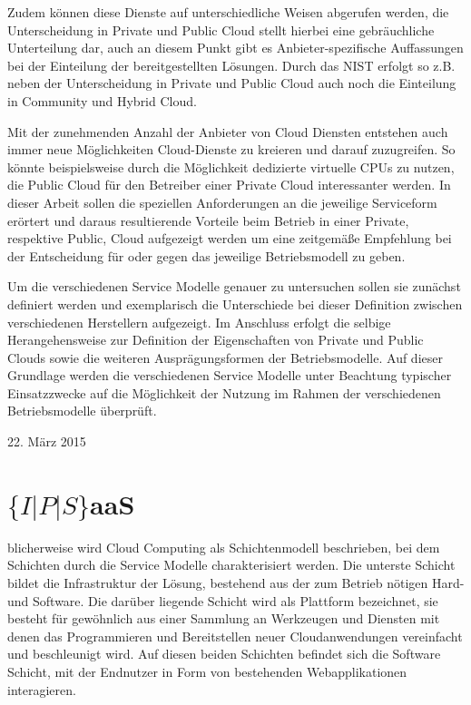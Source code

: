 \documentclass[journal]{IEEEtran}
\begin{document}
Zudem können diese Dienste auf unterschiedliche Weisen abgerufen werden, die Unterscheidung in Private und Public Cloud stellt hierbei eine gebräuchliche Unterteilung dar, auch an diesem Punkt gibt es Anbieter-spezifische Auffassungen bei der Einteilung der bereitgestellten Lösungen. Durch das NIST erfolgt so z.B. neben der Unterscheidung in Private und Public Cloud auch noch die Einteilung in Community und Hybrid Cloud.

Mit der zunehmenden Anzahl der Anbieter von Cloud Diensten entstehen auch immer neue Möglichkeiten Cloud-Dienste zu kreieren und darauf zuzugreifen. So könnte beispielsweise durch die Möglichkeit dedizierte virtuelle CPUs zu nutzen, die Public Cloud für den Betreiber einer Private Cloud interessanter werden. In dieser Arbeit sollen die speziellen Anforderungen an die jeweilige Serviceform erörtert und daraus resultierende Vorteile beim Betrieb in einer Private, respektive Public, Cloud aufgezeigt werden um eine zeitgemäße Empfehlung bei der Entscheidung für oder gegen das jeweilige Betriebsmodell zu geben. 

Um die verschiedenen Service Modelle genauer zu untersuchen sollen sie zunächst definiert werden und exemplarisch die Unterschiede bei dieser Definition zwischen verschiedenen Herstellern aufgezeigt. Im Anschluss erfolgt die selbige Herangehensweise zur Definition der Eigenschaften von Private und Public Clouds sowie die weiteren Ausprägungsformen der Betriebsmodelle. Auf dieser Grundlage werden die verschiedenen Service Modelle unter Beachtung typischer Einsatzzwecke auf die Möglichkeit der Nutzung im Rahmen der verschiedenen Betriebsmodelle überprüft.

\hfill 22. März 2015

\section{$\{I|P|S\}$aaS}
blicherweise wird Cloud Computing als Schichtenmodell beschrieben, bei dem Schichten durch die Service Modelle charakterisiert werden. Die unterste Schicht bildet die Infrastruktur der Lösung, bestehend aus der zum Betrieb nötigen Hard- und Software. Die darüber liegende Schicht wird als Plattform bezeichnet, sie besteht für gewöhnlich aus einer Sammlung an Werkzeugen und Diensten mit denen das Programmieren und Bereitstellen neuer Cloudanwendungen vereinfacht und beschleunigt wird. Auf diesen beiden Schichten befindet sich die Software Schicht, mit der Endnutzer in Form von bestehenden Webapplikationen interagieren.
\end{document}
